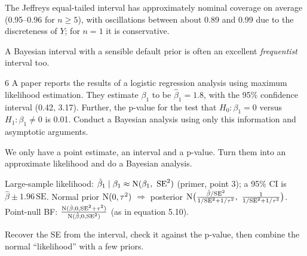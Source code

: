\documentclass[11pt]{article}
\begin{document}
\begin{answer}
The Jeffreys equal-tailed interval has approximately nominal coverage on average (0.95--0.96 for $n\ge5$), with oscillations between about 0.89 and 0.99 due to the discreteness of $Y$; for $n=1$ it is conservative.
\end{answer}

\begin{takeaway}
A Bayesian interval with a sensible default prior is often an excellent \emph{frequentist} interval too.
\end{takeaway}


\begin{problem}{6}
A paper reports the results of a logistic regression analysis using maximum likelihood estimation. They estimate $\beta_1$ to be $\hat\beta_1=1.8$, with the 95\% confidence interval (0.42, 3.17). Further, the p-value for the test that $H_0:\beta_1=0$ versus $H_1:\beta_1\neq0$ is 0.01. Conduct a Bayesian analysis using only this information and asymptotic arguments.
\end{problem}

\begin{restate}
We only have a point estimate, an interval and a p-value. Turn them into an approximate likelihood and do a Bayesian analysis.
\end{restate}

\begin{recall}
Large-sample likelihood: $\hat\beta_1\mid\beta_1\approx\dist N(\beta_1,\ \text{SE}^2)$ (primer, point 3); a 95\% CI is $\hat\beta\pm1.96\,\text{SE}$. Normal prior $\mathrm{N}(0,\tau^2)$ $\Rightarrow$ posterior $\dist N\big(\frac{\hat\beta/\text{SE}^2}{1/\text{SE}^2+1/\tau^2},\ \frac1{1/\text{SE}^2+1/\tau^2}\big)$. Point-null BF: $\frac{\mathrm{N}(\hat\beta;0,\text{SE}^2+\tau^2)}{\mathrm{N}(\hat\beta;0,\text{SE}^2)}$ (as in equation 5.10).
\end{recall}

\begin{keyidea}
Recover the SE from the interval, check it against the p-value, then combine the normal ``likelihood'' with a few priors.
\end{keyidea}
\end{document}
